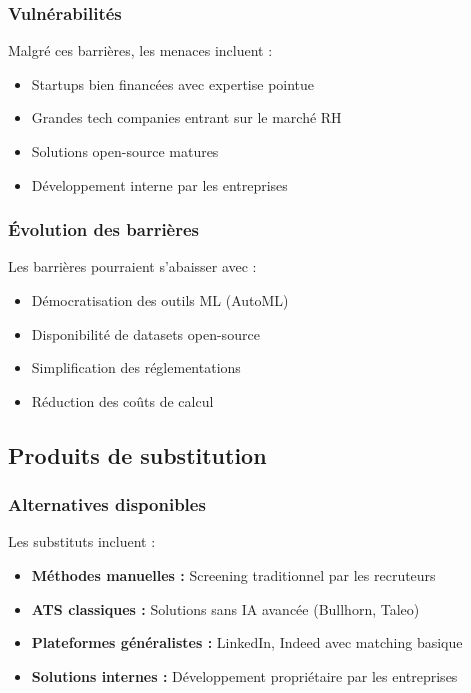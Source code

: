 \documentclass[12pt,a4paper]{report}
\begin{document}
\subsubsection{Vulnérabilités}

Malgré ces barrières, les menaces incluent :
\begin{itemize}
\item Startups bien financées avec expertise pointue
\item Grandes tech companies entrant sur le marché RH
\item Solutions open-source matures
\item Développement interne par les entreprises
\end{itemize}

\subsubsection{Évolution des barrières}

Les barrières pourraient s'abaisser avec :
\begin{itemize}
\item Démocratisation des outils ML (AutoML)
\item Disponibilité de datasets open-source
\item Simplification des réglementations
\item Réduction des coûts de calcul
\end{itemize}

\subsection{Produits de substitution}

\subsubsection{Alternatives disponibles}

Les substituts incluent :
\begin{itemize}
\item \textbf{Méthodes manuelles :} Screening traditionnel par les recruteurs
\item \textbf{ATS classiques :} Solutions sans IA avancée (Bullhorn, Taleo)
\item \textbf{Plateformes généralistes :} LinkedIn, Indeed avec matching basique
\item \textbf{Solutions internes :} Développement propriétaire par les entreprises
\end{itemize}
\end{document}
